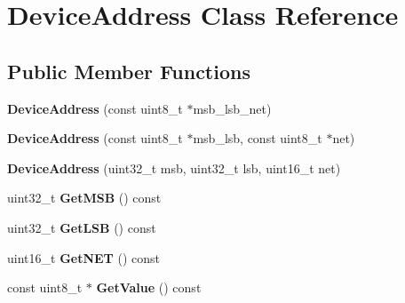 \hypertarget{class_device_address}{}\section{Device\+Address Class Reference}
\label{class_device_address}
\subsection*{Public Member Functions}
\begin{DoxyCompactItemize}
\item 
\hypertarget{class_device_address_a47393b85f2d963195e13732bf1b92ebe}{}{\bfseries Device\+Address} (const uint8\+\_\+t $\ast$msb\+\_\+lsb\+\_\+net)\label{class_device_address_a47393b85f2d963195e13732bf1b92ebe}

\item 
\hypertarget{class_device_address_a23700d852405505711181eff85190f7a}{}{\bfseries Device\+Address} (const uint8\+\_\+t $\ast$msb\+\_\+lsb, const uint8\+\_\+t $\ast$net)\label{class_device_address_a23700d852405505711181eff85190f7a}

\item 
\hypertarget{class_device_address_a401795eb7df3cbe4f6e6b70adf9b0f13}{}{\bfseries Device\+Address} (uint32\+\_\+t msb, uint32\+\_\+t lsb, uint16\+\_\+t net)\label{class_device_address_a401795eb7df3cbe4f6e6b70adf9b0f13}

\item 
\hypertarget{class_device_address_a57bc48e59d6d8bb17b74d8b7c0f19b0e}{}uint32\+\_\+t {\bfseries Get\+M\+S\+B} () const \label{class_device_address_a57bc48e59d6d8bb17b74d8b7c0f19b0e}

\item 
\hypertarget{class_device_address_a452ba13a7c3d4c79af1689eb4b81d7ab}{}uint32\+\_\+t {\bfseries Get\+L\+S\+B} () const \label{class_device_address_a452ba13a7c3d4c79af1689eb4b81d7ab}

\item 
\hypertarget{class_device_address_a354bd15b0235c27cc69a04a04fda5938}{}uint16\+\_\+t {\bfseries Get\+N\+E\+T} () const \label{class_device_address_a354bd15b0235c27cc69a04a04fda5938}

\item 
\hypertarget{class_device_address_a249dd92571ea9001ff02063229bc5283}{}const uint8\+\_\+t $\ast$ {\bfseries Get\+Value} () const \label{class_device_address_a249dd92571ea9001ff02063229bc5283}

\end{DoxyCompactItemize}
